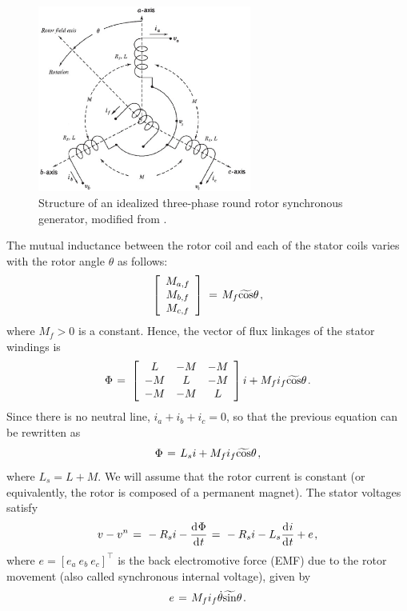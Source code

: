 \documentclass[letterpaper,10pt,conference]{ieeeconf}
\newcommand{\BE}{\begin{equation}}
\newcommand{\BEQ}[1]{\BE\label{#1}} %
\newcommand{\m}      {{\hbox{\hskip 1pt}}}
\newcommand{\dd}     {{\rm d\hbox{\hskip 0.5pt}}}
\begin{document}
\begin{figure} %
\centering \includegraphics[width=7cm]{SGStructure.eps}
\caption[Structure of an idealized three-phase round rotor synchronous
generator]{Structure of an idealized three-phase round rotor
synchronous generator, modified from \cite[Figure 3.4]{GrSt2014}.}
\label{fig:structOfSG} \vspace{-3mm}
\end{figure}

The mutual inductance between the rotor coil and each of the stator
coils varies with the rotor angle $\theta$ as follows:
$$ \left[\begin{array}{c} M_{a,f}\\ M_{b,f}\\ M_{c,f}\end{array}
   \right] \m=\m M_{f}\widetilde{\cos}\theta \m,$$
where $M_f>0$ is a constant. Hence, the vector of flux linkages of the
stator windings is
$$ \Phi \m=\m \left[\begin{array}{ccc} L & -M & -M\\ -M & L & -M\\
   -M & -M & L \end{array}\right]i + M_f i_f\widetilde{\cos}\theta
   \m.$$
Since there is no neutral line, $i_a+i_b+i_c=0$, so that the previous
equation can be rewritten as 
$$\Phi \m=\m L_s i + M_f i_f \widetilde{\cos}\theta \m,$$
where $L_s=L+M$. We will assume that the rotor current is constant
(or equivalently, the rotor is composed of a permanent magnet). The
stator voltages satisfy
\BEQ{eq:SGTerminalVlotage}
   v - v^n \m=\m -R_{s}i-\frac{\dd\Phi}{\dd t} \m=\m -R_{s}i-L_{s}
   \frac{\dd i}{\dd t} + e \m,
\end{equation}
where $e=\left[e_a\ e_b\ e_c \right] ^\top$ is the back electromotive 
force (EMF) due to the rotor movement (also called synchronous 
internal voltage), given by \vspace{-2mm}
\BEQ{eq:emf}
   e \m=\m M_f i_f\dot{\theta}\widetilde{\sin}\theta \m.
\end{equation}
\end{document}

